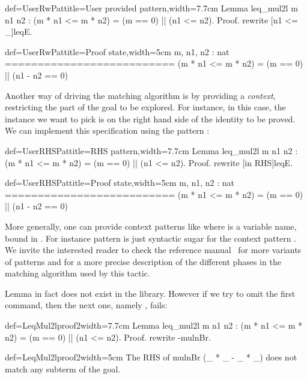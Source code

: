 \begin{coq}{def=UserRwPat}{title=User provided pattern,width=7.7cm}
Lemma leq_mul2l m n1 n2 :
(m * n1 <= m * n2) = (m == 0) || (n1 <= n2).
Proof.
rewrite [n1 <= _]leqE.
\end{coq}
\begin{coqout}{def=UserRwPat}{title=Proof state,width=5cm}
m, n1, n2 : nat
==========================
(m * n1 <= m * n2) =
(m == 0) || (n1 - n2 == 0)
\end{coqout}

Another way of driving the matching algorithm is by providing a
\emph{context}, restricting the part of the goal to be explored. For
instance, in this case, the instance we want to pick is on
the right hand side of the identity to be proved. We can implement
this specification using the pattern \C{[in RHS]}:

\begin{coq}{def=UserRHSPat}{title=RHS pattern,width=7.7cm}
Lemma leq_mul2l m n1 n2 :
(m * n1 <= m * n2) = (m == 0) || (n1 <= n2).
Proof.
rewrite [in RHS]leqE.
\end{coq}
\begin{coqout}{def=UserRHSPat}{title=Proof state,width=5cm}
m, n1, n2 : nat
==========================
(m * n1 <= m * n2) =
(m == 0) || (n1 - n2 == 0)
\end{coqout}

More generally, one can provide context patterns like \C{[in X in T]}
where  is a variable name, bound in . For instance pattern
\C{[in RHS]} is just syntactic sugar for the context pattern
\C{[in X in _ = X]}.  We invite the interested reader to check the
reference manual~\cite[section 8]{ssrman} for more variants of patterns and for a
more precise description of the different phases in the matching
algorithm used by this tactic.

Lemma  in fact does not exist in the library.%
However if we
try to omit the first  command, then the next one,
namely , fails:

\begin{coq}{def=LeqMul2lproof2}{width=7.7cm}
Lemma leq_mul2l m n1 n2 :
(m * n1 <= m * n2) = (m == 0) || (n1 <= n2).
Proof.
rewrite -mulnBr.
\end{coq}
\begin{coqout}{def=LeqMul2lproof2}{width=5cm}
The RHS of mulnBr
  (_ * _ - _ * _)
does not match any subterm
of the goal.
\end{coqout}

